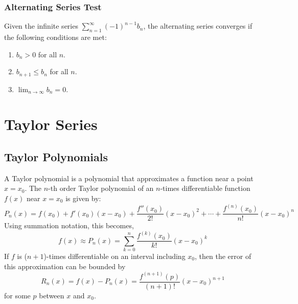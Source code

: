 \documentclass{article}
\begin{document}
\subsubsection{Alternating Series Test}
Given the infinite series \(\sum_{n=1}^{\infty} {\left( -1
\right)}^{n-1} b_n\), the alternating series converges if the following
conditions are met:
\begin{enumerate}[label=(\arabic*)]
    \item \(b_n > 0\) for all \(n\).
    \item \(b_{n+1} \leqslant b_n\) for all \(n\).
    \item \(\lim_{n \to \infty} b_n = 0\).
\end{enumerate}
\section{Taylor Series}
\subsection{Taylor Polynomials}
A Taylor polynomial is a polynomial that approximates a function near a
point \(x = x_0\). The \(n\)-th order Taylor polynomial of an
\(n\)-times differentiable function \(f\left( x \right)\) near \(x =
x_0\) is given by:
\begin{equation*}
    P_n\left( x \right) = f\left( x_0 \right) + f'\left( x_0 \right) \left( x - x_0 \right) + \frac{f''\left( x_0 \right)}{2!} {\left( x - x_0 \right)}^2 + \cdots + \frac{f^{\left( n \right)}\left( x_0 \right)}{n!} {\left( x - x_0 \right)}^n
\end{equation*}
Using summation notation, this becomes,
\begin{equation*}
    f\left( x \right) \approx P_n\left( x \right) = \sum_{k=0}^{n} \frac{f^{\left( k \right)}\left( x_0 \right)}{k!} {\left( x - x_0 \right)}^k
\end{equation*}
If \(f\) is (\(n+1\))-times differentiable on an interval including
\(x_0\), then the error of this approximation can be bounded by
\begin{equation*}
    R_n\left( x \right) = f\left( x \right) - P_n\left( x \right) = \frac{f^{\left( n+1 \right)}\left( p \right)}{\left( n+1 \right)!} {\left( x - x_0 \right)}^{n+1}
\end{equation*}
for some \(p\) between \(x\) and \(x_0\).
\end{document}
